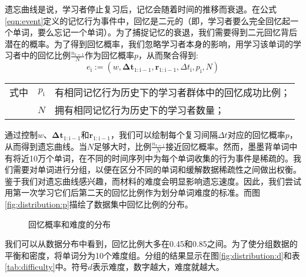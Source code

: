 遗忘曲线是说，学习者停止复习后，记忆会随着时间的推移而衰退。在公式\ref{eqn:event}定义的记忆行为事件中，回忆是二元的（即，学习者要么完全回忆起一个单词，要么忘记一个单词）。为了捕捉记忆的衰退，我们需要得到二元回忆背后潜在的概率。为了得到回忆概率，我们忽略学习者本身的影响，用学习该单词的学习者中的回忆比例$\frac{n_\mathrm{r=1}}{N}$作为回忆概率$p$，从而聚合得到:
\begin{equation}
e_\mathrm{i} :=(w, \bm{\Delta t}_\mathrm{1:i-1}, \bm r_\mathrm{1:i-1}, \Delta t_\mathrm{i} , p_\mathrm{i}, N)
\end{equation}
\begin{tabularx}{\textwidth}{@{}l@{\quad}r@{———}X@{}}
    式中& $p_\mathrm{i}$ &有相同记忆行为历史下的学习者群体中的回忆成功比例；\\
    &  $N$ &拥有相同记忆行为历史下的学习者数量；
\end{tabularx}\vspace{3.15bp}

通过控制$w$、$\bm{\Delta t}_\mathrm{1:i-1}$和$\bm r_\mathrm{1:i-1}$，我们可以绘制每个复习间隔$\Delta t$对应的回忆概率$p$，从而得到遗忘曲线。当$N$足够大时，比例$\frac{n_\mathrm{r=1}}{N}$接近回忆概率。然而，墨墨背单词中有将近10万个单词，在不同的时间序列中为每个单词收集的行为事件是稀疏的。我们需要对单词进行分组，以便在区分不同的单词和缓解数据稀疏性之间做出权衡。鉴于我们对遗忘曲线感兴趣，而材料的难度会明显影响遗忘速度。因此，我们尝试用第一次学习它们后第二天的回忆比例作为划分单词难度的标准。而图\ref{fig:distribution:p}描绘了数据集中回忆比例的分布。

\begin{figure}[htbp]
    \setlength{\subfigcapskip}{-1bp}
    \centering
    \begin{minipage}{\textwidth}
    \centering
    \subfigure{\label{fig:distribution:p}}\addtocounter{subfigure}{-2}
    \hspace{2em}
    \subfigure{\label{fig:distribution:d}}\addtocounter{subfigure}{-2}
    \end{minipage}
    \caption{回忆概率和难度的分布}
    \label{fig:distribution}
\end{figure}

我们可以从数据分布中看到，回忆比例大多在0.45和0.85之间。为了使分组数据的平衡和密度，将单词分为10个难度组。分组的结果显示在图\ref{fig:distribution:d}和表\ref{tab:difficulty}中。符号$d$表示难度，数字越大，难度就越大。

